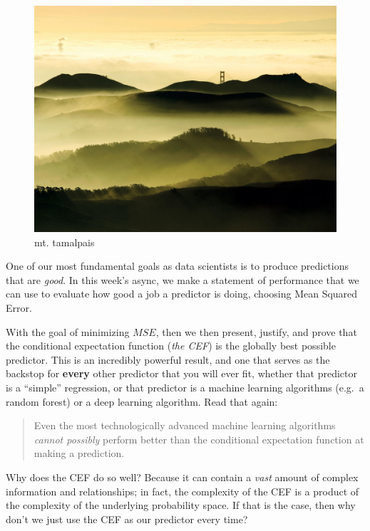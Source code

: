 \documentclass[
  letterpaper,
  DIV=11,
  numbers=noendperiod]{scrreprt}
\begin{document}
\begin{figure}[H]

{\centering \includegraphics{./images/tam-view.jpeg}

}

\caption{mt. tamalpais}

\end{figure}%

One of our most fundamental goals as data scientists is to produce
predictions that are \emph{good}. In this week's async, we make a
statement of performance that we can use to evaluate how good a job a
predictor is doing, choosing Mean Squared Error.

With the goal of minimizing \(MSE\), then we then present, justify, and
prove that the conditional expectation function (\emph{the CEF}) is the
globally best possible predictor. This is an incredibly powerful result,
and one that serves as the backstop for \textbf{every} other predictor
that you will ever fit, whether that predictor is a ``simple''
regression, or that predictor is a machine learning algorithms (e.g.~a
random forest) or a deep learning algorithm. Read that again:

\begin{quote}
Even the most technologically advanced machine learning algorithms
\emph{cannot possibly} perform better than the conditional expectation
function at making a prediction.
\end{quote}

Why does the CEF do so well? Because it can contain a \emph{vast} amount
of complex information and relationships; in fact, the complexity of the
CEF is a product of the complexity of the underlying probability space.
If that is the case, then why don't we just use the CEF as our predictor
every time?
\end{document}
